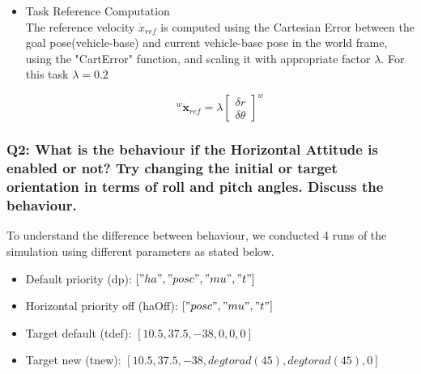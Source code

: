 \documentclass{article}
\begin{document}
\begin{itemize}
	
	\item Task Reference Computation \\
	The reference velocity $\dot{x}_{ref}$ is computed using the Cartesian Error between the goal pose(vehicle-base) and current vehicle-base pose in the world frame, using the "CartError" function, and scaling it with appropriate factor $\lambda$. For this task $\lambda = 0.2 $
	
	\begin{equation}
	^{w}\dot{\boldsymbol{x}}_{ref}=\lambda \left[\begin{array}{c}{\delta{r} } \\ {\delta{\theta}}\end{array}\right]^{w}
	\end{equation}
	
\end{itemize}

\subsubsection{Q2: What is the behaviour if the Horizontal Attitude is enabled or not? Try changing the initial or target orientation in terms of roll and pitch angles. Discuss the behaviour.}

To understand the difference between behaviour, we conducted  4 runs of the simulation using different parameters as stated below. 

\begin{itemize}
	\item Default priority (dp): $ \left[ "ha", "posc", "mu", "t" \right]$ 
	\item Horizontal priority off (haOff):  $ \left[ "posc", "mu", "t" \right]$ 
	\item Target default (tdef): $ \left[10.5, 37.5, -38, 0, 0, 0 \right]$ 
	\item Target new (tnew): $ \left[10.5, 37.5, -38, degtorad(45), degtorad(45), 0 \right]$  
\end{itemize}
\end{document}
